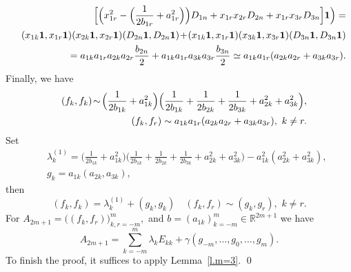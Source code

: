 \documentclass[preprint,12pt]{elsarticle}
\numberwithin{equation}{section}
\begin{document}
\begin{pf}
\begin{eqnarray*}
&&\Big[\Big(x^2_{1r}-\Big(\frac{1}{2b_{1r}}+a^2_{1r}\Big)\Big)D_{1n}+x_{1r}x_{2r}D_{2n}+x_{1r}x_{3r}D_{3n}\Big]{\bf 1}\Big)= \\
&&(x_{1k}{\bf 1},x_{1r}{\bf 1})(x_{2k}{\bf 1},x_{2r}{\bf 1})(D_{2n}{\bf 1},D_{2n}{\bf 1})\!+\!
(x_{1k}{\bf 1},x_{1r}{\bf 1})(x_{3k}{\bf 1},x_{3r}{\bf 1})(D_{3n}{\bf 1},D_{3n}{\bf 1})\\
&&=a_{1k}a_{1r}a_{2k}a_{2r}\frac{b_{2n}}{2}+a_{1k}a_{1r}a_{3k}a_{3r}\frac{b_{3n}}{2}\simeq a_{1k}a_{1r}(a_{2k}a_{2r}+a_{3k}a_{3r}).
\end{eqnarray*}
Finally, we have
\begin{eqnarray}
 \label{(A_{r,s}),DX1,m=3}
&&(f_k,f_k)\!\sim\!
\Big(\frac{1}{2b_{1k}}+a_{1k}^2\Big)\Big(\frac{1}{2b_{1k}}+\frac{1}{2b_{2k}}+\frac{1}{2b_{3k}}+a_{2k}^2+a_{3k}^2\Big),\\
\nonumber
&&(f_k,f_r)\sim a_{1k}a_{1r}(a_{2k}a_{2r}+a_{3k}a_{3r}),\,\, k\not=r.
\end{eqnarray}
Set
\begin{eqnarray}
\nonumber
&&\lambda_k^{(1)}=\Big(\frac{1}{2b_{1k}}+a_{1k}^2\Big)\Big(\frac{1}{2b_{1k}}+\frac{1}{2b_{2k}}+\frac{1}{2b_{3k}}+a_{2k}^2+a_{3k}^2\Big)-
a_{1k}^2(a_{2k}^2+a_{3k}^2),\\
\label{l_k(xD)}
&& g_k=a_{1k}(a_{2k},a_{3k}),
\end{eqnarray}
then
\begin{equation}
(f_k,f_k)=\lambda_k^{(1)}+(g_k,g_k)
\quad (f_k,f_r)\sim (g_k,g_r),\,\,k\not=r.
\end{equation}
For $A_{2m+1}=\big((f_k,f_r)\big)_{k,r=-m}^m,$ and
$b=(a_{1k})_{k=-m}^m\in {\mathbb R}^{2m+1}$ we have
$$
A_{2m+1}= \sum_{k=-m}^m\lambda_kE_{kk}+\gamma(g_{-m},\dots,g_0,\dots,g_m).
$$
To finish the proof, it  suffices to apply  Lemma~\ref{l.m=3}. 
\qed\end{pf}
\end{document}
